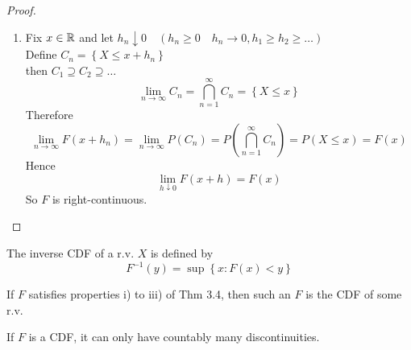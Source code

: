 \begin{theorem}
\begin{proof}
\begin{enumerate}[label = \roman*)]
            Define $B_n = \left\{X\leq n\right\}$,
            \\then $B_1 \subseteq B_2 \subseteq \dots$
            \begin{center}
            \end{center}
            \[\bigcup_{n=1}^{\infty} B_n = \Omega\]
            \begin{align*}
                \lim_{n \to \infty} F(n) &= \lim_{n \to \infty} P(B_n) \\
                &= P\left(\bigcup_{n=1}^{\infty}B_n\right) \\
                &= P(\Omega) = 1
            \end{align*}
            \item Fix $x\in \mathbb{R}$ and let $h_n \downarrow 0 \quad (h_n \geq 0 \quad h_n \rightarrow 0, h_1 \geq h_2 \geq \dots)$
            \\Define $C_n = \left\{X\leq x+h_n\right\}$
            \\then $C_1 \supseteq C_2 \supseteq \dots$
            \[\lim_{n \to \infty} C_n = \bigcap_{n=1}^{\infty} C_n = \left\{X\leq x\right\} \]
            Therefore
            \[\lim_{n \to \infty} F(x+h_n) = \lim_{n \to \infty} P(C_n) = P(\bigcap_{n=1}^{\infty} C_n) = P(X \leq x) = F(x) \]
            Hence
            \[\lim_{h \downarrow 0}F(x+h) = F(x)  \]
            So $F$ is right-continuous.
        \end{enumerate}
    \end{proof}
\end{theorem}

\begin{definition}
    The inverse CDF of a r.v. $X$ is defined by
    \[F^{-1}(y) = \sup\left\{x:F(x) < y\right\}\]
\end{definition}

\begin{reqnoproof}
\begin{theorem}[][3.5.1]
    If $F$ satisfies properties i) to iii) of Thm 3.4, then such an $F$ is the CDF of some r.v. 
\end{theorem}
\end{reqnoproof}

\begin{theorem}[][3.6]
    If $F$ is a CDF, it can only have countably many discontinuities.
\end{theorem}
